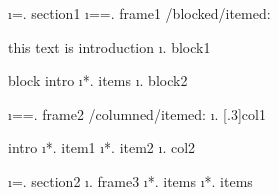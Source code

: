 \documentclass[]{beamer}
\begin{document}
\i=. section1
\i==. frame1 \s/blocked/itemed:
\par this text is introduction
\i*. block1
\par block intro
\i**. items
\i*. block2

\i==. frame2 \s/columned/itemed:
\i*. [.3]col1
\par intro
\i**. item1
\i**. item2
\i*. col2

\i=. section2
\i*. frame3
\i**. items
\i**. items
\endoutline
\end{document}
